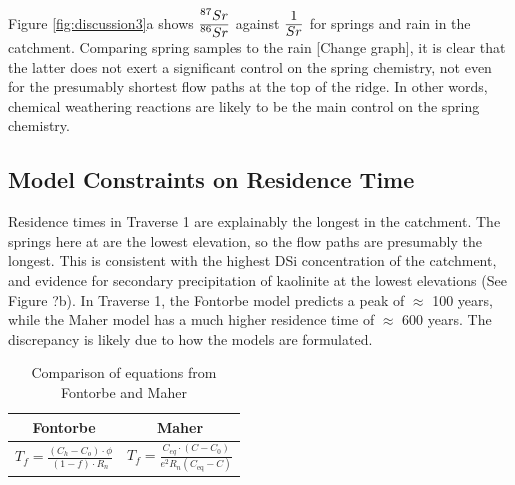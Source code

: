 \FloatBarrier

Figure \ref{fig:discussion3}a shows $\ddfrac{^{87}Sr}{^{86}Sr}$ against $\ddfrac{1}{Sr}$ for springs and rain in the catchment. Comparing spring samples to the rain [Change graph], it is clear that the latter does not exert a significant control on the spring chemistry, not even for the presumably shortest flow paths at the top of the ridge. In other words, chemical weathering reactions are likely to be the main control on the spring chemistry.













\subsection{Model Constraints on Residence Time}

Residence times in Traverse 1 are explainably the longest in the catchment. The springs here at are the lowest elevation, so the flow paths are presumably the longest. This is consistent with the highest DSi concentration of the catchment, and evidence for secondary precipitation of kaolinite at the lowest elevations (See Figure ?b). In Traverse 1, the Fontorbe model predicts a peak of $\approx$ 100 years, while the Maher model has a much higher residence time of $\approx$ 600 years. The discrepancy is likely due to how the models are formulated.

\begin{table}[h]
    \centering
    \renewcommand{\arraystretch}{2.2} %
    \begin{tabular}{cc}
        \toprule
        \textbf{Fontorbe} & \textbf{Maher} \\
        \midrule
        $\displaystyle T_f  = \frac{\left(C_h - C_o\right)\cdot\phi}{\left(1-f\right)\cdot R_n}$ & 
        $\displaystyle T_f = \frac{C_{eq} \cdot \left(C - C_0\right)}{e^2 R_n \left( C_{\text{eq}} - C \right)}$ \\ [10pt]
        \bottomrule
    \end{tabular}
    \caption{Comparison of equations from Fontorbe and Maher}
    \label{tab:equations}
\end{table}

